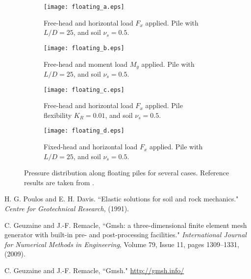 \documentclass[a4]{article}
\begin{document}
\begin{figure}[tbh!]
	\centering
	\begin{subfigure}[b]{0.48\textwidth}
		\centering
		\texttt{[image: floating\_a.eps]}
		\caption{Free-head and horizontal load $F_x$ applied. Pile with $L/D=25$, and soil $\nu_s=0.5$.}
		\label{fig:floating_results_a}
	\end{subfigure}
	\begin{subfigure}[b]{0.48\textwidth}
		\centering
		\texttt{[image: floating\_b.eps]}
		\caption{Free-head and moment load $M_y$ applied. Pile with $L/D=25$, and soil $\nu_s=0.5$.}
		\label{fig:floating_results_b}
	\end{subfigure}
	\begin{subfigure}[b]{0.48\textwidth}
		\centering
		\texttt{[image: floating\_c.eps]}
		\caption{Free-head and horizontal load $F_x$ applied. Pile flexibility $K_R=0.01$, and soil $\nu_s=0.5$.}
		\label{fig:floating_results_c}
	\end{subfigure}
	\begin{subfigure}[b]{0.48\textwidth}
		\centering
		\texttt{[image: floating\_d.eps]}
		\caption{Fixed-head and horizontal load $F_x$ applied. Pile with $L/D=25$, and soil $\nu_s=0.5$.}
		\label{fig:floating_results_d}
	\end{subfigure}    
	\caption{Pressure distribution along floating piles for several  cases. Reference results are taken from \cite{poulos}.}
	\label{fig:results}
\end{figure}

\FloatBarrier

\begin{thebibliography}{99}
	
	 H. G. Poulos and E. H. Davis. ``Elastic solutions for soil and rock mechanics." \textit{Centre for Geotechnical Research}, (1991).

	 C. Geuzaine and J.-F. Remacle, ``Gmsh: a three-dimensional finite element mesh generator with built-in pre- and post-processing facilities." \textit{International Journal for Numerical Methods in Engineering}, Volume 79, Issue 11, pages 1309--1331, (2009).
	
	 C. Geuzaine and J.-F. Remacle, ``Gmsh." \url{http://gmsh.info/}

\end{thebibliography}
\end{document}
